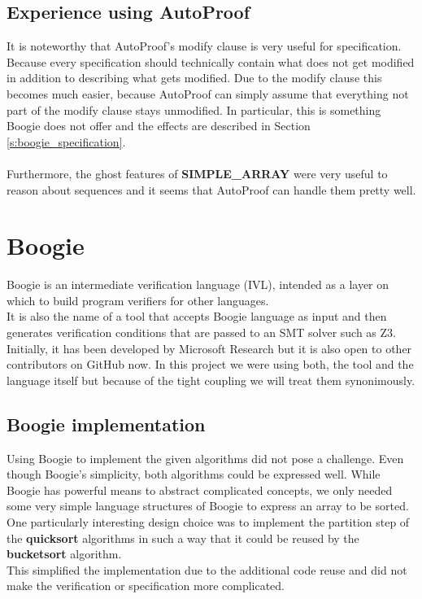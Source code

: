 \documentclass{report}
\begin{document}
\subsection{Experience using AutoProof}

It is noteworthy that AutoProof's modify clause is very useful for specification.
Because every specification should technically contain what does not get modified
in addition to describing what gets modified. Due to the modify clause this
becomes much easier, because AutoProof can simply assume that everything not part
of the modify clause stays unmodified. In particular, this is something Boogie does not 
offer and the effects are described in Section \ref{s:boogie_specification}.
\\
\\
Furthermore, the ghost features of \textbf{SIMPLE\_ARRAY} were very useful to
reason about sequences and it seems that AutoProof can handle them pretty well.

\section{Boogie}
\label{s:boogie}
Boogie is an intermediate verification language (IVL), intended as a layer on which to build program verifiers for other languages\cite{boogiegithub}.\\
It is also the name of a tool that accepts Boogie language as input and then generates verification conditions that are passed to an SMT solver such as Z3\cite{de2008z3}\cite{z3}.\\
Initially, it has been developed by Microsoft Research but it is also open to other contributors on GitHub now.
In this project we were using both, the tool and the language itself but because of the tight coupling we will treat them synonimously.

\subsection{Boogie implementation}

Using Boogie to implement the given algorithms did not pose a challenge.
Even though Boogie's simplicity, both algorithms could be expressed well.
While Boogie has powerful means to abstract complicated concepts\cite{leino2008boogie}, we only
needed some very simple language structures of Boogie to express an array to be sorted.\\
One particularly interesting design choice was to implement the partition step
of the \textbf{quicksort} algorithms in such a way that it could be reused by the \textbf{bucketsort} algorithm.\\
This simplified the implementation due to the additional code reuse and did not
make the verification or specification more complicated.
\end{document}
